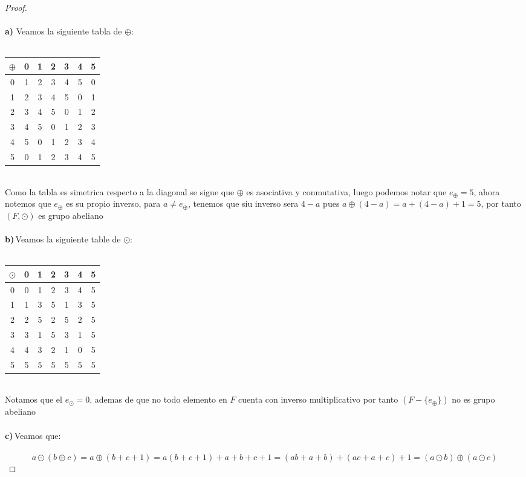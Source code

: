 \documentclass[11pt,letterpaper]{article}
\begin{document}
\begin{proof}\,\\
	\,\\
	\textbf{a)}\,\,Veamos la siguiente tabla de $\oplus $:\,\\
	\,\\
	\begin{table}[h!]
		\centering
		 \begin{tabular}{||c c c c c c c||} 
		 \hline
		 $\oplus$ & 0 & 1 & 2 & 3 & 4 &5 \\ [0.5ex] 
		 \hline\hline
		 0 & 1 & 2 & 3 & 4 & 5 &0 \\
		 1& 2 & 3 & 4 & 5 & 0 &1 \\
		 2 & 3 & 4 & 5 & 0 & 1 &2 \\
		 3 & 4 & 5 & 0 & 1 & 2 &3  \\
		 4 & 5 & 0 & 1 & 2 & 3 &4 \\
		 5 & 0 & 1 & 2 & 3 & 4 &5 \\[1ex] 
		 \hline
		 \end{tabular}
		\end{table}
	  \,\\
Como la tabla es simetrica respecto a la diagonal se sigue que $\oplus$ es asociativa y conmutativa, luego podemos notar
que $e_{\oplus}=5$, ahora notemos que $e_{\oplus}$ es su propio inverso, para $a\neq e_{\oplus}$, tenemos que siu inverso sera $4-a$ pues
$a\oplus (4-a)=a+(4-a)+1=5$, por tanto $(F,\odot)$ es grupo abeliano\,\\
\,\\
\textbf{b)}\,Veamos la siguiente table de $\odot$:\,\\
\,\\
\begin{table}[h!]
	\centering
	 \begin{tabular}{||c c c c c c c||} 
	 \hline
	 $\odot$ & 0 & 1 & 2 & 3 & 4 &5 \\ [0.5ex] 
	 \hline\hline
	 0 & 0 & 1 & 2 & 3 & 4 &5 \\
	 1& 1 & 3 & 5& 1 & 3 &5 \\
	 2 & 2 & 5 & 2 & 5 & 2 &5 \\
	 3 & 3 & 1 & 5 & 3 & 1 &5  \\
	 4 & 4 & 3 & 2 & 1 & 0 &5 \\
	 5 & 5 & 5 & 5 & 5 & 5 &5 \\[1ex] 
	 \hline
	 \end{tabular}
	\end{table}
  \,\\
  Notamos que el $e_{\odot}=0$, ademas de que no todo elemento en $F$ cuenta con inverso multiplicativo
  por tanto $(F-\{e_{\oplus}\})$ no es grupo abeliano\,\\
  \,\\
  \textbf{c)}\,Veamos que:\,\\
  \,\\
  \begin{equation*}
	a\odot(b\oplus c)=a\oplus(b+c+1)=a(b+c+1)+a+b+c+1=(ab+a+b)+(ac+a+c)+1=(a\odot b)\oplus (a\odot c)
  \end{equation*}
\end{proof}\,\\
\end{document}
